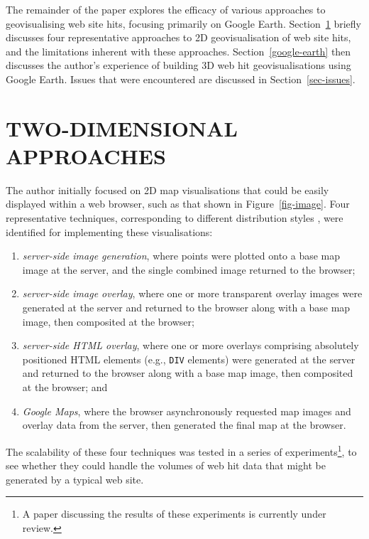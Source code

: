 \documentclass[10pt]{article}
\begin{document}
The remainder of the paper explores the efficacy of various approaches to geovisualising web site hits, focusing primarily on Google Earth. Section~\ref{sec-two-dimensional} briefly discusses four representative approaches to 2D geovisualisation of web site hits, and the limitations inherent with these approaches. Section~\ref{google-earth} then discusses the author's experience of building 3D web hit geovisualisations using Google Earth. Issues that were encountered are discussed in Section~\ref{sec-issues}.


\section{TWO-DIMENSIONAL APPROACHES}
\label{sec-two-dimensional}

The author initially focused on 2D map visualisations that could be easily displayed within a web browser, such as that shown in Figure~\ref{fig-image}. Four representative techniques, corresponding to different distribution styles \cite{Wood-J-1996-vis,MacE-AM-1998-GIS}, were identified for implementing these visualisations:
\begin{enumerate}

	\item \emph{server-side image generation}, where points were plotted onto a base map image at the server, and the single combined image returned to the browser;
	
	\item \emph{server-side image overlay}, where one or more transparent overlay images were generated at the server and returned to the browser along with a base map image, then composited at the browser;
	
	\item \emph{server-side HTML overlay}, where one or more overlays comprising absolutely positioned HTML elements (e.g., \texttt{DIV} elements) were generated at the server and returned to the browser along with a base map image, then composited at the browser; and
	
	\item \emph{Google Maps}, where the browser asynchronously requested map images and overlay data from the server, then generated the final map at the browser.

\end{enumerate}
The scalability of these four techniques was tested in a series of experiments\footnote{A paper discussing the results of these experiments is currently under review.}, to see whether they could handle the volumes of web hit data that might be generated by a typical web site.
\end{document}
